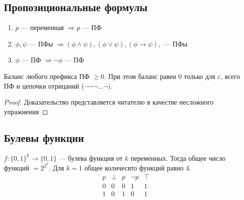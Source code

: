 \subsection{Пропозициональные формулы}
\begin{enumerate}
    \item $p$ --- переменная $\Rightarrow p$ --- ПФ
    \item $\phi, \psi$ --- ПФы $\Rightarrow (\phi \wedge \psi), (\phi \vee \psi), (\phi \rightarrow \psi), $ --- ПФы
    \item $\phi$ --- ПФ $\Rightarrow \neg\phi$ --- ПФ
\end{enumerate}
\begin{lemma}
    Баланс любого префикса ПФ $\ge 0$. При этом баланс равен 0 только для $\varepsilon$, всего ПФ и цепочки отрицаний ($\neg\neg\neg\dots\neg$).
\end{lemma}
\begin{proof}
Доказательство представляется читателю в качестве несложного упражнения
\end{proof}
\subsection{Булевы функции}
$f: \{0, 1\}^k \rightarrow \{0, 1\}$ --- булева функция от $k$ переменных. Тогда общее число функций $= 2^{2^k}$. Для $k = 1$ общее количесвто функций равно 4.
$$\begin{array}{c|cccc}
    p & \perp & p & \neg p & \top\\
    \hline
    0 & 0 & 0 & 1 & 1 \\
    1 & 0 & 1 & 0 & 1
\end{array}$$

